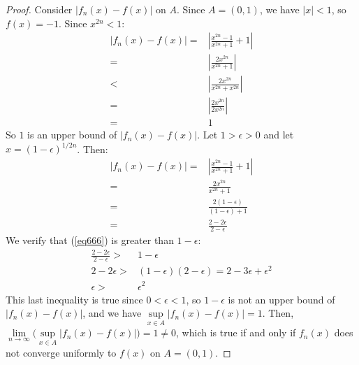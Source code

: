 \documentclass{article}
\newcommand{\eps}{\ensuremath{\epsilon}}
\newcommand{\limxy}[2]{\ensuremath{\underset{#1 \to #2 }{\lim}}}
\begin{document}
\begin{proof}
	Consider $|f_n(x) - f(x)|$ on $A$.
	Since $A = (0,1)$, we have $|x| < 1$,
	so $f(x) = -1$.
	Since $x^{2n} < 1$:
	\begin{align}
		|f_n(x) - f(x)| = & |\frac{x^{2n} - 1}{x^{2n} + 1} + 1| \\
		= & |\frac{2x^{2n}}{x^{2n} + 1}| \\
		< & |\frac{2x^{2n}}{x^{2n} + x^{2n}}| \\
		= & |\frac{2x^{2n}}{2x^{2n}}| \\
		= & 1
	\end{align}
	So $1$ is an upper bound of $|f_n(x) - f(x)|$.
	Let $1 > \eps > 0$ and let $x = (1 - \eps)^{1/2n} $.
	Then:
	\begin{align}
		|f_n(x) - f(x)| = & |\frac{x^{2n} - 1}{x^{2n} + 1} + 1| \\
			= & \frac{2x^{2n}}{x^{2n} + 1} \\
			= & \frac{2(1-\eps)}{(1-\eps) + 1} \\
			= & \frac{2-2\eps}{2-\eps} \label{eq666}
	\end{align}
	We verify that (\ref{eq666}) is greater than $1 - \eps$:
	\begin{align}
		\frac{2-2\eps}{2-\eps} > & 1 - \eps \\
		2-2\eps > & (1-\eps)(2-\eps) = 2 - 3\eps + \eps^2 \\
		\eps > & \eps^2
	\end{align}
	This last inequality is true since $0 < \eps < 1$,
	so $1 - \eps$ is not an upper bound of $|f_n(x) - f(x)|$,
	and we have $\underset{x \in A}{\sup}|f_n(x) - f(x)| = 1$.
	Then, $\limxy{n}{\infty}\Big(\underset{x \in A}{\sup}|f_n(x) - f(x)|\Big) = 1 \neq 0$,
	which is true if and only if
	$f_n(x)$ does not converge uniformly to $f(x)$ on $A = (0,1)$.
\end{proof}
\end{document}
